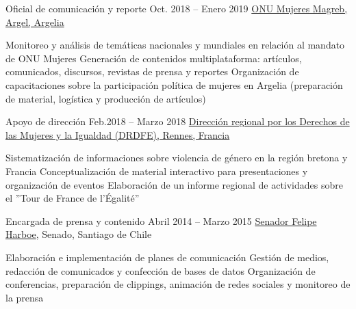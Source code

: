 \begin{joblist}[13.2][7.8][3.4]

\item[Oficial de comunicación y reporte]{Oct. 2018 -- Enero 2019 }
    {
    \href{http://maghreb.unwomen.org/fr}{ONU Mujeres Magreb, Argel, Argelia}
    }
    {
        \vspace{-0.5cm}
        \begin{itemize}
            \iftbftiny \setlength\itemsep{-3pt} \fi
            \cvitem[\checkmark]  Monitoreo y análisis de temáticas nacionales y mundiales en relación al mandato de ONU Mujeres
            \cvitem[\checkmark]  Generación de contenidos multiplataforma: artículos, comunicados, discursos, revistas de prensa y reportes
            \cvitem[\checkmark]  Organización de capacitaciones sobre la participación política de mujeres en Argelia (preparación de material, logística y producción de artículos)
        \end{itemize}
    }


\item[Apoyo de dirección]{Feb.2018 -- Marzo 2018 }
    {
    \href{https://www.egalite-femmes-hommes.gouv.fr/le-secretariat-d-etat/organisation-du-ministere/services-territoriaux/annuaire-des-equipes-regionales-et-departementales/}{Dirección regional por los Derechos de las Mujeres y la Igualdad (DRDFE), Rennes, Francia}
    }
    {
        \iftbftiny \vspace{-0.5cm} \fi
        \begin{itemize}
            \iftbftiny \setlength\itemsep{-3pt} \fi
            \cvitem[\checkmark] Sistematización de informaciones sobre violencia de género en la región bretona y Francia
            \cvitem[\checkmark] Conceptualización de material interactivo para presentaciones y organización de eventos
            \cvitem[\checkmark] Elaboración de un informe regional de actividades sobre el ''Tour de France de l'Égalité''
        \end{itemize}
    }



\item[Encargada de prensa y contenido ]{Abril 2014 -- Marzo 2015}
    {
    \href{https://www.harboe.cl/}{Senador Felipe Harboe}, Senado, Santiago de Chile
    }
    {
        \iftbftiny \vspace{-0.5cm} \fi
        \begin{itemize}
            \iftbftiny \setlength\itemsep{-3pt} \fi
            \cvitem[\checkmark] Elaboración e implementación de planes de comunicación
            \cvitem[\checkmark] Gestión de medios, redacción de comunicados y confección de bases de datos 
            \cvitem[\checkmark] Organización de conferencias, preparación de clippings, animación de redes sociales y monitoreo de la prensa
            

\end{itemize}}
\end{joblist}
